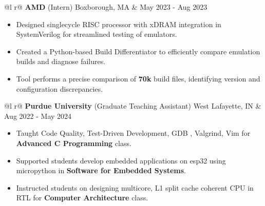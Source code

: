 \documentclass[a4paper,10pt]{article}
\begin{document}
\begin{tabularx}{\linewidth}{ @{}l r@{} }
    \textbf{AMD} (Intern) Boxborough, MA & \hfill {\small May 2023 - Aug 2023} \\[2.75pt]
    {
        \begin{minipage}[t]{\linewidth}
            \begin{itemize}[nosep,after=\strut, leftmargin=2em, itemsep=3pt]
                \item Designed singlecycle RISC processor with xDRAM integration in SystemVerilog for streamlined testing of emulators.
                \item Created a Python-based Build Differentiator to efficiently compare emulation builds and diagnose failures.
                \item Tool performs a precise comparison of \textbf{70k} build files, identifying version and configuration discrepancies.
            \end{itemize}
        \end{minipage}
    }
\end{tabularx}
\vspace{0.1cm}

\begin{tabularx}{\linewidth}{ @{}l r@{} }
    \textbf{Purdue University} (Graduate Teaching Assistant) West Lafayette, IN & \hfill {\small Aug 2022 - May 2024} \\[2.75pt]
    {
        \begin{minipage}[t]{\linewidth}
            \begin{itemize}[nosep,after=\strut, leftmargin=2em, itemsep=3pt]
                \item Taught Code Quality, Test-Driven Development, GDB , Valgrind, Vim for \textbf{Advanced C Programming} class.
                \item Supported students develop embedded applications on esp32 using micropython in \textbf{Software for Embedded Systems}.
                \item Instructed students on designing multicore, L1 split cache coherent CPU in RTL for \textbf{Computer Architecture} class.     
            \end{itemize}
        \end{minipage}
    }  
\end{tabularx}
\vspace{0.1cm}
\end{document}
